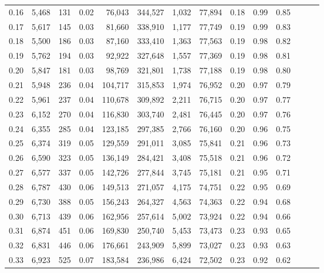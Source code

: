 \begin{tabular}{rrrrrrrrrrrrrr}
0.16 &   5,468 &    131 &  0.02 &   76,043 &  344,527 &   1,032 &  77,894 &  0.18 &  0.99 &      0.85 \\
0.17 &   5,617 &    145 &  0.03 &   81,660 &  338,910 &   1,177 &  77,749 &  0.19 &  0.99 &      0.83 \\
0.18 &   5,500 &    186 &  0.03 &   87,160 &  333,410 &   1,363 &  77,563 &  0.19 &  0.98 &      0.82 \\
0.19 &   5,762 &    194 &  0.03 &   92,922 &  327,648 &   1,557 &  77,369 &  0.19 &  0.98 &      0.81 \\
0.20 &   5,847 &    181 &  0.03 &   98,769 &  321,801 &   1,738 &  77,188 &  0.19 &  0.98 &      0.80 \\
0.21 &   5,948 &    236 &  0.04 &  104,717 &  315,853 &   1,974 &  76,952 &  0.20 &  0.97 &      0.79 \\
0.22 &   5,961 &    237 &  0.04 &  110,678 &  309,892 &   2,211 &  76,715 &  0.20 &  0.97 &      0.77 \\
0.23 &   6,152 &    270 &  0.04 &  116,830 &  303,740 &   2,481 &  76,445 &  0.20 &  0.97 &      0.76 \\
0.24 &   6,355 &    285 &  0.04 &  123,185 &  297,385 &   2,766 &  76,160 &  0.20 &  0.96 &      0.75 \\
0.25 &   6,374 &    319 &  0.05 &  129,559 &  291,011 &   3,085 &  75,841 &  0.21 &  0.96 &      0.73 \\
0.26 &   6,590 &    323 &  0.05 &  136,149 &  284,421 &   3,408 &  75,518 &  0.21 &  0.96 &      0.72 \\
0.27 &   6,577 &    337 &  0.05 &  142,726 &  277,844 &   3,745 &  75,181 &  0.21 &  0.95 &      0.71 \\
0.28 &   6,787 &    430 &  0.06 &  149,513 &  271,057 &   4,175 &  74,751 &  0.22 &  0.95 &      0.69 \\
0.29 &   6,730 &    388 &  0.05 &  156,243 &  264,327 &   4,563 &  74,363 &  0.22 &  0.94 &      0.68 \\
0.30 &   6,713 &    439 &  0.06 &  162,956 &  257,614 &   5,002 &  73,924 &  0.22 &  0.94 &      0.66 \\
0.31 &   6,874 &    451 &  0.06 &  169,830 &  250,740 &   5,453 &  73,473 &  0.23 &  0.93 &      0.65 \\
0.32 &   6,831 &    446 &  0.06 &  176,661 &  243,909 &   5,899 &  73,027 &  0.23 &  0.93 &      0.63 \\
0.33 &   6,923 &    525 &  0.07 &  183,584 &  236,986 &   6,424 &  72,502 &  0.23 &  0.92 &      0.62 \\

\end{tabular}
